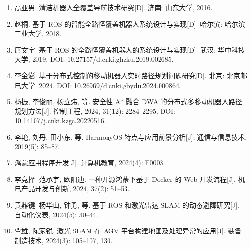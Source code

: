 \documentclass[12pt,a4paper,openany,oneside]{ctexbook}
\begin{document}
\begin{enumerate}
\item 高亚男. 清洁机器人全覆盖导航技术研究[D]. 济南: 山东大学, 2016.
\item 赵桐. 基于 ROS 的智能全路径覆盖机器人系统设计与实现[D]. 哈尔滨: 哈尔滨工业大学, 2018.
\item 唐文宇. 基于 ROS 的全路径覆盖机器人的系统设计与实现[D]. 武汉: 华中科技大学, 2019. DOI: 10.27157/d.cnki.ghzku.2019.002685.
\item 李金澎. 基于分布式控制的移动机器人实时路径规划问题研究[D]. 北京: 北京邮电大学, 2024. DOI: 10.26969/d.cnki.gbydu.2024.000864.
\item 杨振, 李俊丽, 杨立炜, 等. 安全性 A* 融合 DWA 的分布式多移动机器人路径规划方法[J]. 控制工程, 2024, 31(12): 2284--2295. DOI: 10.14107/j.cnki.kzgc.20220516.
\item 李艳, 刘丹, 田小东, 等. HarmonyOS 特点与应用前景分析[J]. 通信与信息技术, 2019(5): 85--87.
\item 鸿蒙应用程序开发[J]. 计算机教育, 2024(4): F0003.
\item 李竞择, 范承宇, 欧阳迪. 一种开源鸿蒙下基于 Docker 的 Web 开发流程[J]. 机电产品开发与创新, 2024, 37(2): 51--53.
\item 黄鼎键, 杨华山, 钟勇, 等. 基于 ROS 和激光雷达 SLAM 的动态避障研究[J]. 自动化仪表, 2024(5): 30--34.
\item 覃雄, 陈家锐. 激光 SLAM 在 AGV 平台构建地图及处理异常的应用[J]. 装备制造技术, 2024(3): 105--107, 130.
\end{enumerate}

\appendix

\end{document}
